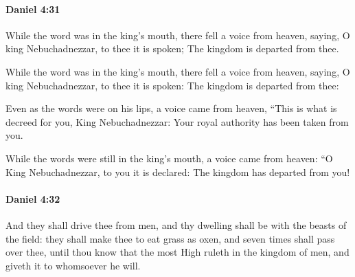 		\paragraph{Daniel 4:31} %
			\label{DANIEL-4-31}

			While the word was in the king’s mouth, there fell a voice from heaven, saying, O king Nebuchadnezzar, to thee it is spoken; The kingdom is departed from thee.

			\begin{versebox}
					\item[BHS] 
					\item[ASV] While the word was in the king's mouth, there fell a voice from heaven, saying, O king Nebuchadnezzar, to thee it is spoken: The kingdom is departed from thee:
					\item[NIV] Even as the words were on his lips, a voice came from heaven, “This is what is decreed for you, King Nebuchadnezzar: Your royal authority has been taken from you.
					\item[NRSV] While the words were still in the king’s mouth, a voice came from heaven: “O King Nebuchadnezzar, to you it is declared: The kingdom has departed from you!
			\end{versebox}

		\paragraph{Daniel 4:32} %
			\label{DANIEL-4-32}

			And they shall drive thee from men, and thy dwelling shall be with the beasts of the field: they shall make thee to eat grass as oxen, and seven times shall pass over thee, until thou know that the most High ruleth in the kingdom of men, and giveth it to whomsoever he will.

